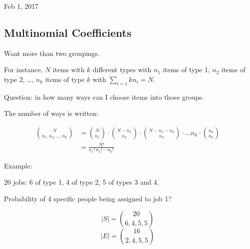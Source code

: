 \documentclass[main.tex]{subfiles}
\begin{document}
\hrulefill{}

Feb 1, 2017

\vspace{3mm}

\subsection{Multinomial Coefficients}

Want more than two groupings.

For instance, $N$ items with $k$ different types with $n_1$ items of type 1, $n_2$ items of type 2, \ldots, $n_k$ items of type $k$ with $\sum\limits_{i=1}{k} n_i = N$.

Question: in how many ways can I choose items into those groups.

The number of ways is written:

\begin{align}
{{N}\choose {n_1, n_2, \ldots, n_k}} &= {{N} \choose{n_1}} \cdot {{N-n_1} \choose{n_2}} \cdot {{N-n_1-n_2} \choose{n_3}} \cdot \ldots{n_k} \cdot {{n_k}\choose{n_k}}\\
                                   &= \frac{N!}{n_1!\,n_2!\,\cdots \, n_k!}
\end{align}

Example:

20 jobs: 6 of type 1, 4 of type 2, 5 of types 3 and 4.

Probability of 4 specific people being assigned to job 1?

$$|S| = {{20}\choose{6,4,5,5}}$$
$$|E| = {{16}\choose{2,4,5,5}}$$

\hrulefill{}
\end{document}
